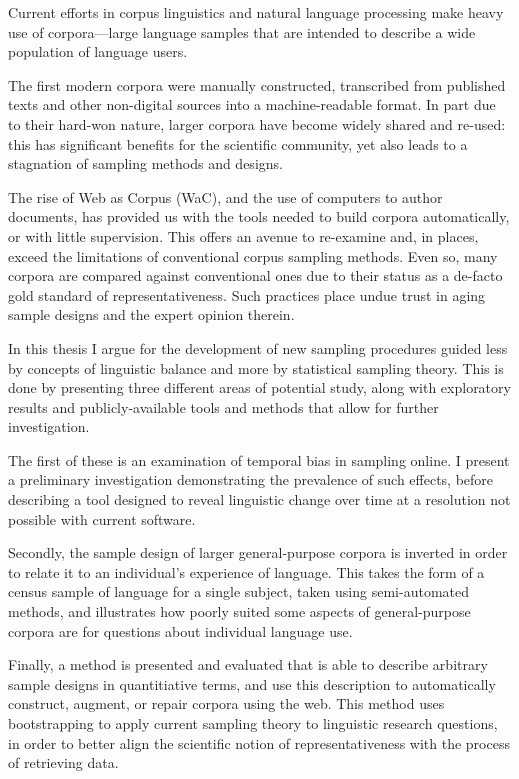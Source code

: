 Current efforts in corpus linguistics and natural language processing make heavy use of corpora---large language samples that are intended to describe a wide population of language users.


The first modern corpora were manually constructed, transcribed from published texts and other non-digital sources into a machine-readable format.  In part due to their hard-won nature, larger corpora have become widely shared and re-used: this has significant benefits for the scientific community, yet also leads to a stagnation of sampling methods and designs.

The rise of Web as Corpus (WaC), and the use of computers to author documents, has provided us with the tools needed to build corpora automatically, or with little supervision.  
This offers an avenue to re-examine and, in places, exceed the limitations of conventional corpus sampling methods.  
Even so, many corpora are compared against conventional ones due to their status as a de-facto gold standard of representativeness.  Such practices place undue trust in aging sample designs and the expert opinion therein.


In this thesis I argue for the development of new sampling procedures guided less by concepts of linguistic balance and more by statistical sampling theory.
This is done by presenting three different areas of potential study, along with exploratory results and publicly-available tools and methods that allow for further investigation.

The first of these is an examination of temporal bias in sampling online.  I present a preliminary investigation demonstrating the prevalence of such effects, before describing a tool designed to reveal linguistic change over time at a resolution not possible with current software.

Secondly, the sample design of larger general-purpose corpora is inverted in order to relate it to an individual's experience of language.  This takes the form of a census sample of language for a single subject, taken using semi-automated methods, and illustrates how poorly suited some aspects of general-purpose corpora are for questions about individual language use.

Finally, a method is presented and evaluated that is able to describe arbitrary sample designs in quantitiative terms, and use this description to automatically construct, augment, or repair corpora using the web.  This method uses bootstrapping to apply current sampling theory to linguistic research questions, in order to better align the scientific notion of representativeness with the process of retrieving data.

